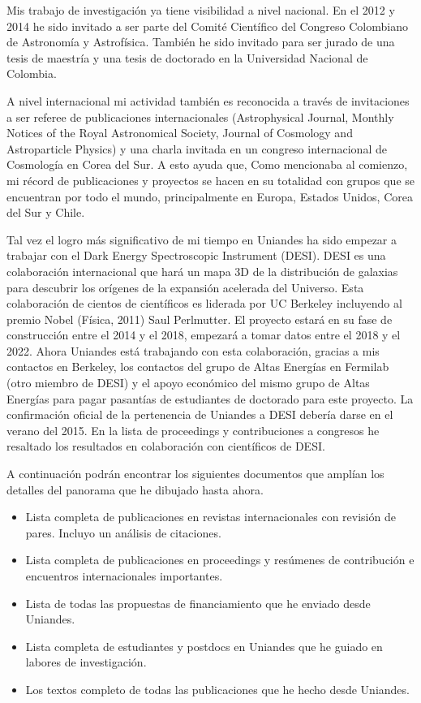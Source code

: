 \documentclass[letterpaper,12pt,onecolumn]{article}
\begin{document}
Mis trabajo de investigaci\'on ya tiene visibilidad a nivel nacional. En
el 2012 y 2014 he sido invitado a ser parte del Comit\'e Cient\'ifico del
Congreso Colombiano de Astronom\'ia y Astrof\'isica. Tambi\'en he sido
invitado para ser jurado de una tesis de maestr\'ia y una tesis de
doctorado en la Universidad Nacional de Colombia.  

A nivel internacional mi actividad tambi\'en es reconocida a trav\'es de
invitaciones a ser referee de publicaciones internacionales
(Astrophysical Journal, Monthly Notices of the Royal Astronomical
Society, Journal of Cosmology and Astroparticle Physics) y una charla
invitada en un congreso internacional de Cosmolog\'ia en Corea del
Sur. A esto ayuda que, Como mencionaba al comienzo, mi r\'ecord de
publicaciones y proyectos se hacen en su totalidad con grupos que se
encuentran por todo el mundo, principalmente en Europa, Estados
Unidos, Corea del Sur y Chile.

Tal vez el logro m\'as significativo de mi tiempo en Uniandes ha sido
empezar a trabajar con el Dark Energy Spectroscopic Instrument (DESI). DESI
es una colaboraci\'on internacional que har\'a un mapa 3D de la
distribuci\'on de galaxias para descubrir los or\'igenes de la expansi\'on
acelerada del Universo. Esta colaboraci\'on de cientos de cient\'ificos es
liderada por UC Berkeley incluyendo al premio Nobel (F\'isica, 2011)
Saul Perlmutter. El proyecto estar\'a en su fase de construcci\'on entre el
2014 y el 2018, empezar\'a a tomar datos entre el 2018 y el 2022. Ahora
Uniandes est\'a trabajando con esta colaboraci\'on, gracias a mis
contactos en Berkeley, los contactos del grupo de Altas Energ\'ias en
Fermilab (otro miembro de DESI) y el apoyo econ\'omico del mismo grupo
de Altas Energ\'ias para pagar pasant\'ias de estudiantes de doctorado
para este proyecto. La confirmaci\'on oficial de la pertenencia de
Uniandes a DESI deber\'ia darse en el verano del 2015. En la lista de
proceedings y contribuciones a congresos he resaltado los resultados
en colaboraci\'on con cient\'ificos de DESI.

A continuaci\'on podr\'an encontrar los siguientes documentos que
ampl\'ian los detalles del panorama que he dibujado hasta ahora.

\begin{itemize}
\item Lista completa de publicaciones en revistas internacionales
  con revisi\'on de pares. Incluyo un an\'alisis de citaciones.
\item Lista completa de publicaciones en proceedings y res\'umenes de
  contribuci\'on e encuentros internacionales importantes.
\item Lista de todas las propuestas de financiamiento que he enviado
  desde Uniandes.
\item Lista completa de estudiantes y postdocs en Uniandes que he guiado
  en labores de investigaci\'on. 
\item Los textos completo de todas las publicaciones que he hecho desde
  Uniandes.
\end{itemize}
\end{document}
